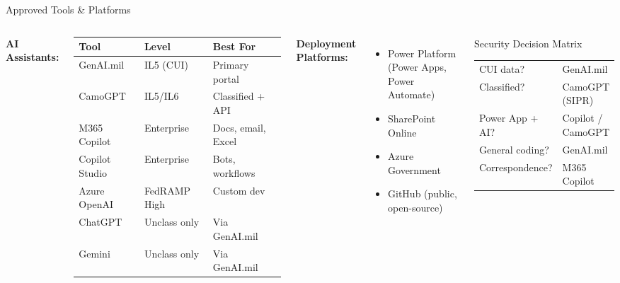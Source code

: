\documentclass[aspectratio=169,11pt]{beamer}
\newcommand{\navy}[1]{\textbf{\color{navyblue}#1}}
\begin{document}
\begin{frame}[shrink=5]{Approved Tools \& Platforms}

\begin{columns}[T]

\navy{AI Assistants:}

\renewcommand{\arraystretch}{1.05}
{\scriptsize
\begin{tabular}{@{}lll@{}}
\toprule
\textbf{Tool} & \textbf{Level} & \textbf{Best For} \\
\midrule
GenAI.mil & IL5 (CUI) & Primary portal \\
CamoGPT & IL5/IL6 & Classified + API \\
M365 Copilot & Enterprise & Docs, email, Excel \\
Copilot Studio & Enterprise & Bots, workflows \\
Azure OpenAI & FedRAMP High & Custom dev \\
ChatGPT & Unclass only & Via GenAI.mil \\
Gemini & Unclass only & Via GenAI.mil \\
\bottomrule
\end{tabular}
}

\vspace{8pt}

\navy{Deployment Platforms:}
\begin{itemize}\small
  \item Power Platform (Power Apps, Power Automate)
  \item SharePoint Online
  \item Azure Government
  \item GitHub (public, open-source)
\end{itemize}


\begin{block}{\faShield*\quad Security Decision Matrix}
{\scriptsize
\begin{tabular}{@{}ll@{}}
CUI data? & GenAI.mil \\
Classified? & CamoGPT (SIPR) \\
Power App + AI? & Copilot / CamoGPT \\
General coding? & GenAI.mil \\
Correspondence? & M365 Copilot \\
\end{tabular}
}
\end{block}


\end{columns}
\end{frame}
\end{document}
